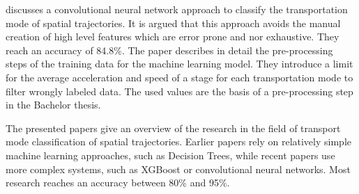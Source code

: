 \cite{Dabiri2018} discusses a convolutional neural network approach to classify the transportation mode of spatial trajectories. It is argued that this approach avoids the manual creation of high level features which are error prone and nor exhaustive. They reach an accuracy of 84.8\%.\newline
The paper describes in detail the pre-processing steps of the training data for the machine learning model. They introduce a limit for the average acceleration and speed of a stage for each transportation mode to filter wrongly labeled data. The used values are the basis of a pre-processing step in the Bachelor thesis.

The presented papers give an overview of the research in the field of transport mode classification of spatial trajectories. Earlier papers rely on relatively simple machine learning approaches, such as Decision Trees, while recent papers use more complex systems, such as XGBoost or convolutional neural networks. Most research reaches an accuracy between 80\% and 95\%. \cite{Zheng2008} \cite{Xiao2017} \cite{Dabiri2018}